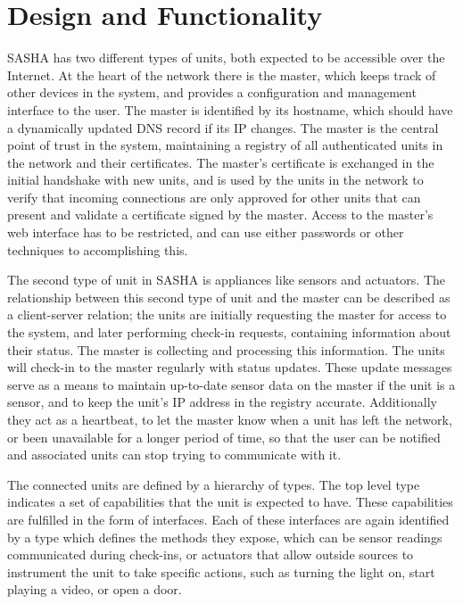\section{Design and Functionality}

SASHA has two different types of units, both expected to be accessible over the Internet. At the heart of the network there is the master, which keeps track of other devices in the system, and provides a configuration and management interface to the user. The master is identified by its hostname, which should have a dynamically updated DNS record if its IP changes. The master is the central point of trust in the system, maintaining a registry of all authenticated units in the network and their certificates. The master's certificate is exchanged in the initial handshake with new units, and is used by the units in the network to verify that incoming connections are only approved for other units that can present and validate a certificate signed by the master. Access to the master's web interface has to be restricted, and can use either passwords or other techniques to accomplishing this.

The second type of unit in SASHA is appliances like sensors and actuators. The relationship between this second type of unit and the master can be described as a client-server relation; the units are initially requesting the master for access to the system, and later performing check-in requests, containing information about their status. The master is collecting and processing this information. The units will check-in to the master regularly with status updates. These update messages serve as a means to maintain up-to-date sensor data on the master if the unit is a sensor, and to keep the unit's IP address in the registry accurate. Additionally they act as a heartbeat, to let the master know when a unit has left the network, or been unavailable for a longer period of time, so that the user can be notified and associated units can stop trying to communicate with it.

The connected units are defined by a hierarchy of types. The top level type indicates a set of capabilities that the unit is expected to have. These capabilities are fulfilled in the form of interfaces. Each of these interfaces are again identified by a type which defines the methods they expose, which can be sensor readings communicated during check-ins, or actuators that allow outside sources to instrument the unit to take specific actions, such as turning the light on, start playing a video, or open a door.


